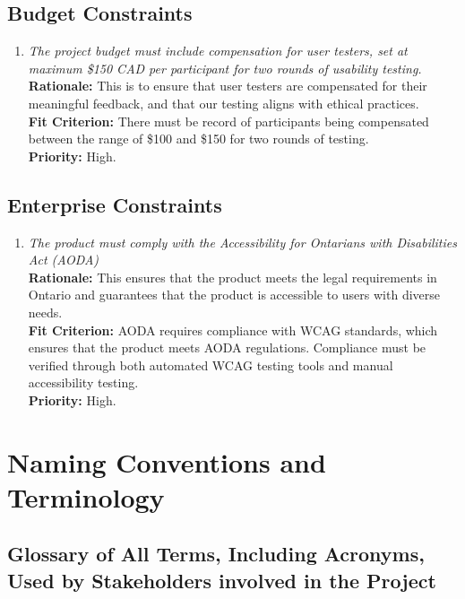 \documentclass[12pt]{article}
\begin{document}
\subsection{Budget Constraints}
\begin{enumerate}[label=MD-BC \arabic*., wide=0pt, leftmargin=*]
  \item \emph{The project budget must include compensation for user
      testers, set at maximum \$150 CAD per participant for two rounds
    of usability testing.}\\[2mm]
    {\bf Rationale:} This is to ensure that user testers are
    compensated for their meaningful feedback,
    and that our testing aligns with ethical practices.\\
    {\bf Fit Criterion:} There must be record of participants being
    compensated between the range of \$100 and \$150 for
    two rounds of testing. \\
    {\bf Priority:} High.
\end{enumerate}
\subsection{Enterprise Constraints}
\begin{enumerate}[label=MD-EC \arabic*., wide=0pt, leftmargin=*]
  \item \emph{The product must comply with the Accessibility for
    Ontarians with Disabilities Act (AODA)}\\[2mm]
    {\bf Rationale:} This ensures that the product meets the legal
    requirements in Ontario and guarantees that
    the product is accessible to users with diverse needs.\\
    {\bf Fit Criterion:} AODA requires compliance with WCAG
    standards, which ensures that the product meets AODA regulations.
    Compliance must be verified through both automated WCAG testing
    tools and manual accessibility testing.\\
    {\bf Priority:} High.
\end{enumerate}

\section{Naming Conventions and Terminology}
\subsection{Glossary of All Terms, Including Acronyms, Used by Stakeholders
involved in the Project}
\end{document}
